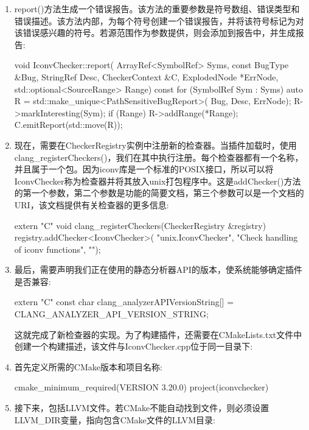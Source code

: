 \begin{enumerate}
\item
report()方法生成一个错误报告。该方法的重要参数是符号数组、错误类型和错误描述。该方法内部，为每个符号创建一个错误报告，并将该符号标记为对该错误感兴趣的符号。若源范围作为参数提供，则会添加到报告中，并生成报告:

\begin{cpp}
void IconvChecker::report(
        ArrayRef<SymbolRef> Syms, const BugType &Bug,
        StringRef Desc, CheckerContext &C,
        ExplodedNode *ErrNode,
        std::optional<SourceRange> Range) const {
    for (SymbolRef Sym : Syms) {
        auto R = std::make_unique<PathSensitiveBugReport>(
            Bug, Desc, ErrNode);
        R->markInteresting(Sym);
        if (Range)
            R->addRange(*Range);
        C.emitReport(std::move(R));
    }
}
\end{cpp}

\item
现在，需要在CheckerRegistry实例中注册新的检查器。当插件加载时，使用clang\_registerCheckers()，我们在其中执行注册。每个检查器都有一个名称，并且属于一个包。因为iconv库是一个标准的POSIX接口，所以可以将IconvChecker称为检查器并将其放入unix打包程序中。这是addChecker()方法的第一个参数，第二个参数是功能的简要文档，第三个参数可以是一个文档的URI，该文档提供有关检查器的更多信息:

\begin{cpp}
extern "C" void
clang_registerCheckers(CheckerRegistry &registry) {
    registry.addChecker<IconvChecker>(
        "unix.IconvChecker",
        "Check handling of iconv functions", "");
}
\end{cpp}

\item
最后，需要声明我们正在使用的静态分析器API的版本，使系统能够确定插件是否兼容:

\begin{cpp}
extern "C" const char clang_analyzerAPIVersionString[] =
    CLANG_ANALYZER_API_VERSION_STRING;
\end{cpp}

这就完成了新检查器的实现。为了构建插件，还需要在CMakeLists.txt文件中创建一个构建描述，该文件与IconvChecker.cpp位于同一目录下:

\item
首先定义所需的CMake版本和项目名称:

\begin{cmake}
cmake_minimum_required(VERSION 3.20.0)
project(iconvchecker)
\end{cmake}

\item
接下来，包括LLVM文件。若CMake不能自动找到文件，则必须设置LLVM\_DIR变量，指向包含CMake文件的LLVM目录:


\end{enumerate}
